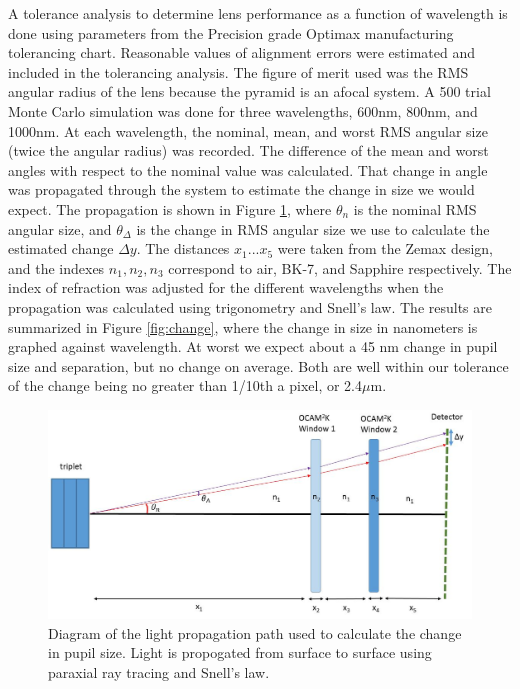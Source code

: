 A tolerance analysis to determine lens performance as a function of wavelength is done using parameters from the Precision grade Optimax manufacturing tolerancing chart. Reasonable values of alignment errors were estimated and included in the tolerancing analysis. The figure of merit used was the RMS angular radius of the lens because the pyramid is an afocal system. A 500 trial Monte Carlo simulation was done for three wavelengths, 600nm, 800nm, and 1000nm. At each wavelength, the nominal, mean, and worst RMS angular size (twice the angular radius) was recorded. The difference of the mean and worst angles with respect to the nominal value was calculated. That change in angle was propagated through the system to estimate the change in size we would expect. The propagation is shown in Figure \ref{fig:propagation}, where $\theta_n$ is the nominal RMS angular size, and $\theta_\Delta$ is the change in RMS angular size we use to calculate the estimated change $\Delta y$. The distances $x_1 ... x_5$ were taken from the Zemax design, and the indexes $n_1, n_2, n_3$ correspond to air, BK-7, and Sapphire respectively. The index of refraction was adjusted for the different wavelengths when the propagation was calculated using trigonometry and Snell's law. The results are summarized in Figure \ref{fig:change}, where the change in size in nanometers is graphed against wavelength. At worst we expect about a 45 nm change in pupil size and separation, but no change on average. Both are well within our tolerance of the change being no greater than 1/10th a pixel, or 2.4$\mu$m.

	
	
	
\begin{figure}[h]
	\centering
	\includegraphics[width=.8\textwidth]{Chapter Materials/Chapter Three Materials/propagation.JPG}
	\caption{Diagram of the light propagation path used to calculate the change in pupil size. Light is propogated from surface to surface using paraxial ray tracing and Snell's law.}
	\label{fig:propagation}
\end{figure}
	
